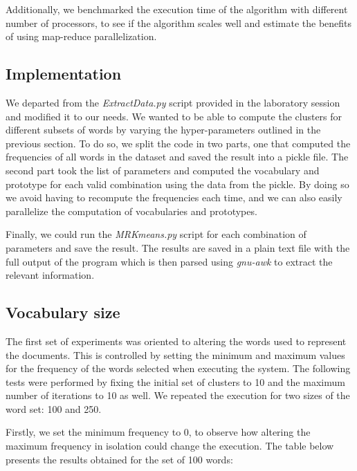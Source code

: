 Additionally, we benchmarked the execution time of the algorithm with different number
of processors, to see if the algorithm scales well and estimate the benefits of using
map-reduce parallelization.

\subsection{Implementation}

We departed from the \emph{ExtractData.py} script provided in the laboratory session and modified it
to our needs. We wanted to be able to compute the clusters for different subsets of words by varying
the hyper-parameters outlined in the previous section. To do so, we split the code in two parts,
one that computed the frequencies of all words in the dataset and saved the result into a pickle file.
The second part took the list of parameters and computed the vocabulary and prototype for each valid
combination using the data from the pickle. By doing so we avoid having to recompute the frequencies each
time, and we can also easily parallelize the computation of vocabularies and prototypes.

Finally, we could run the \emph{MRKmeans.py} script for each combination of parameters and
save the result. The results are saved in a plain text file with the full output of the program
which is then parsed using \emph{gnu-awk} to extract the relevant information.


\subsection{Vocabulary size}

The first set of experiments was oriented to altering the words used to represent the documents. This is controlled by setting the minimum and maximum values for the frequency of the words selected when executing the system. The following tests were performed by fixing the initial set of clusters to 10 and the maximum number of iterations to 10 as well. We repeated the execution for two sizes of the word set: 100 and 250.

Firstly, we set the minimum frequency to 0, to observe how altering the maximum frequency in isolation could change the execution. The table below presents the results obtained for the set of 100 words:

